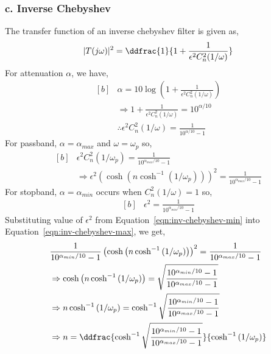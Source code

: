 \subsubsection*{c. Inverse Chebyshev}
The transfer function of an inverse chebyshev filter is given as,
\begin{equation}
   |T(j\omega)|^2=\ddfrac{1}{1+\frac{1}{\epsilon^2C_n^2(1/\omega)}}
\end{equation}
For attenuation $\alpha$, we have,
\begin{equation}
   \begin{aligned}[b]
     &\alpha=10\log{\left(1+\frac{1}{\epsilon^2C_n^2(1/\omega)}\right)}\\
     &\Rightarrow 1+\frac{1}{\epsilon^2C_n^2(1/\omega)}=10^{\alpha/10}\\
     &\therefore \epsilon^2C_n^2(1/\omega)=\frac{1}{10^{\alpha/10}-1}
   \end{aligned}
\end{equation}
For passband, $\alpha=\alpha_{max}$ and $\omega=\omega_p$ so,
\begin{equation}
  \begin{aligned}[b]
   &\epsilon^2C_n^2(1/\omega_p)=\frac{1}{10^{\alpha_{max}/10}-1}\\
   & \Rightarrow \epsilon^2\left(\cosh \left(n \cosh^{-1}\left(1/\omega_p\right)\right)\right)^2=\frac{1}{10^{\alpha_{max}/10}-1}
  \end{aligned}
   \label{eqn:inv-chebyshev-max}
\end{equation}
For stopband, $\alpha=\alpha_{min}$ occurs when $C_n^2(1/\omega)=1$ so,
\begin{equation}
   \begin{aligned}[b]
      &\epsilon^2=\frac{1}{10^{\alpha_{min}/10}-1}
   \end{aligned}
   \label{eqn:inv-chebyshev-min}
\end{equation}
Substituting value of $\epsilon^2$ from Equation~\ref{eqn:inv-chebyshev-min} into Equation~\ref{eqn:inv-chebyshev-max}, we get,
\begin{equation}
   \begin{aligned}[b]
      & \frac{1}{10^{\alpha_{min}/10}-1}\left(\cosh \left(n \cosh^{-1}\left(1/\omega_p\right)\right)\right)^2=\frac{1}{10^{\alpha_{max}/10}-1}\\
      & \Rightarrow\cosh \left(n \cosh^{-1}\left(1/\omega_p\right)\right)=\sqrt{\frac{10^{\alpha_{min}/10}-1}{10^{\alpha_{max}/10}-1}}\\
      & \Rightarrow n \cosh^{-1}\left(1/\omega_p\right)=\cosh^{-1}\sqrt{\frac{10^{\alpha_{min}/10}-1}{10^{\alpha_{max}/10}-1}}\\
      & \Rightarrow n =\ddfrac{\cosh^{-1}\sqrt{\frac{10^{\alpha_{min}/10}-1}{10^{\alpha_{max}/10}-1}}}{\cosh^{-1}\left(1/\omega_p\right)}
   \end{aligned}
   \label{eqn:inv-chebyshev-f1}
\end{equation}
